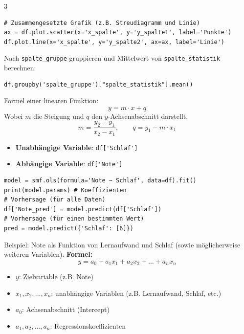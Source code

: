 \begin{landscape}
\begin{multicols*}{3}
\begin{cheatSheetBox}[title=Grafiken erstellen]
\begin{lstlisting}
# Zusammengesetzte Grafik (z.B. Streudiagramm und Linie)
ax = df.plot.scatter(x='x_spalte', y='y_spalte1', label='Punkte')
df.plot.line(x='x_spalte', y='y_spalte2', ax=ax, label='Linie')
\end{lstlisting}
		\end{cheatSheetBox}

		\begin{cheatSheetBox}[title=Gruppieren]
			Nach \texttt{spalte\_gruppe} gruppieren und Mittelwert von \texttt{spalte\_statistik} berechnen:
			\begin{lstlisting}
df.groupby('spalte_gruppe')["spalte_statistik"].mean()
\end{lstlisting}
		\end{cheatSheetBox}
		\columnbreak

		\begin{cheatSheetBox}[title=Lineare Funktion]
			Formel einer linearen Funktion:
			\[y = m \cdot x + q\]
			Wobei $m$ die Steigung und $q$ den $y$-Achsenabschnitt darstellt.
			\[m=\frac{y_2 - y_1}{x_2 - x_1},\quad\quad q = y_1 - m \cdot x_1\]
		\end{cheatSheetBox}
		\begin{cheatSheetBox}[title=Lineare Regression]
			\begin{itemize}
				\item \textbf{Unabhängige Variable}: \lstinline|df['Schlaf']|
				\item \textbf{Abhängige Variable}: \lstinline|df['Note']|
			\end{itemize}
			\begin{lstlisting}
model = smf.ols(formula='Note ~ Schlaf', data=df).fit()
print(model.params) # Koeffizienten
# Vorhersage (für alle Daten)
df['Note_pred'] = model.predict(df['Schlaf']) 
# Vorhersage (für einen bestimmten Wert)
pred = model.predict({'Schlaf': [6]})
\end{lstlisting}
		\end{cheatSheetBox}

		\begin{cheatSheetBox}[title=Multiple lineare Regression]
			Beispiel: Note als Funktion von Lernaufwand und Schlaf (sowie möglicherweise weiteren Variablen).
			\textbf{Formel:}
			\[
				y = a_0 + a_1 x_1 + a_2 x_2 + \ldots + a_n x_n
			\]
			\begin{itemize}
				\item $y$: Zielvariable (z.B. Note)
				\item $x_1, x_2, \ldots, x_n$: unabhängige Variablen (z.B. Lernaufwand, Schlaf, etc.)
				\item $a_0$: Achsenabschnitt (Intercept)
				\item $a_1, a_2, \ldots, a_n$: Regressionskoeffizienten
			\end{itemize}
		\end{cheatSheetBox}


\end{multicols*}
\end{landscape}
